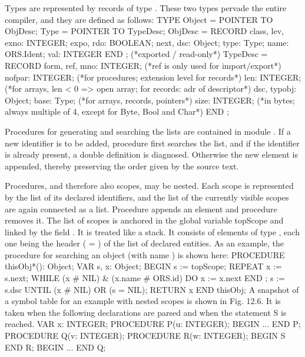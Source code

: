 Types are represented by records of type . These two types pervade the entire compiler, and they are defined as follows:
\begintt
TYPE Object = POINTER TO ObjDesc;
  Type = POINTER TO TypeDesc;
  ObjDesc = RECORD
    class, lev, exno: INTEGER;
    expo, rdo: BOOLEAN; next, dsc: Object; type: Type;
    name: ORS.Ident; val: INTEGER
  END ;
  (*exported / read-only*)
  TypeDesc = RECORD
    form, ref, mno: INTEGER; (*ref is only used for import/export*)
    nofpar: INTEGER; (*for procedures; extension level for records*)
    len: INTEGER; (*for arrays, len < 0 => open array; for records: adr of descriptor*)
    dsc, typobj: Object;
    base: Type; (*for arrays, records, pointers*)
    size: INTEGER; (*in bytes; always multiple of 4, except for Byte, Bool and Char*)
  END ;
\endtt

\noindent Procedures for generating and searching the lists are contained in module . If a new identifier is to be added, procedure  first searches the list, and if the identifier is already present, a double definition is diagnosed. Otherwise the new element is appended, thereby preserving the order given by the source text.

Procedures, and therefore also scopes, may be nested. Each scope is represented by the list of its declared identifiers, and the list of the currently visible scopes are again connected as a list. Procedure  appends an element and procedure  removes it. The list of scopes is anchored in the global variable topScope and linked by the field . It is treated like a stack. It consists of elements of type , each one being the header ( = ) of the list of declared entities. As an example, the procedure for searching an object (with name ) is shown here:
\begintt
PROCEDURE thisObj*(): Object;
  VAR s, x: Object;
BEGIN
  s := topScope;
  REPEAT x := s.next;
  WHILE (x # NIL) & (x.name # ORS.id)
  DO x := x.next END ;
  s := s.dsc
  UNTIL (x # NIL) OR (s = NIL); RETURN x
END thisObj;
\endtt
A snapshot of a symbol table for an example with nested scopes is shown in Fig. 12.6. It is taken
when the following declarations are parsed and when the statement S is reached.
\begintt
VAR x: INTEGER;
PROCEDURE P(u: INTEGER);
BEGIN ... END P;
PROCEDURE Q(v: INTEGER);
PROCEDURE R(w: INTEGER);
BEGIN S END R;
BEGIN ... END Q;
\endtt


